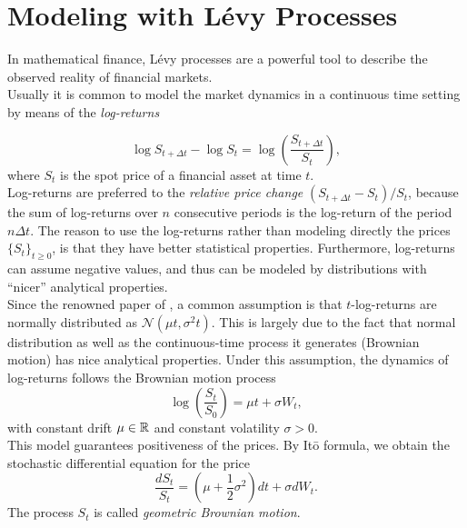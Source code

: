 

\chapter{Modeling with Lévy Processes}\label{Chapter1}
\minitoc%


\vspace{5em}

In mathematical finance, Lévy processes are a powerful tool to describe the observed reality of financial markets.\\ 
Usually it is common to model the market dynamics in a continuous time setting by means of the \emph{log-returns}

\begin{equation}
 \log S_{t+\Delta t} - \log S_t = \log \left(\frac{S_{t+\Delta t}}{S_t}\right),
\end{equation}
where $S_t$ is the spot price of a financial asset at time $t$.\\
Log-returns are preferred to the \emph{relative price change} $(S_{t+\Delta t} - S_t )/S_t$, because the sum of log-returns 
over $n$ consecutive periods is the log-return of the period $n \Delta t$.
The reason to use the log-returns rather than modeling directly the prices $\{S_t\}_{t \geq0}$, is that they have better statistical properties.
Furthermore, log-returns can assume negative values, and thus can be modeled by distributions
with ``nicer'' analytical properties.\\
Since the renowned paper of \cite{BS73}, a common assumption is that $t$-log-returns are 
normally distributed as $\mathcal{N}(\mu t,\sigma^2 t)$. 
This is largely due to the fact that normal distribution as well as the continuous-time process
it generates (Brownian motion) has nice analytical properties.
Under this assumption, the dynamics  of log-returns follows the Brownian motion process
\begin{equation}\label{GBM}
 \log \left( \frac{S_t}{S_0} \right) = \mu t + \sigma W_t ,
\end{equation}
with constant drift $\mu \in \mathbb{R}$ and constant volatility $\sigma >0$.\\
This model guarantees positiveness of the prices. By It\={o} formula, we obtain the stochastic differential equation for the price
\begin{equation}\label{GBM_sde}
 \frac{d S_t}{S_t} = (\mu + \frac{1}{2} \sigma^2) d t + \sigma dW_t  .
\end{equation}
The process $S_t$ is called \emph{geometric Brownian motion}.\\
